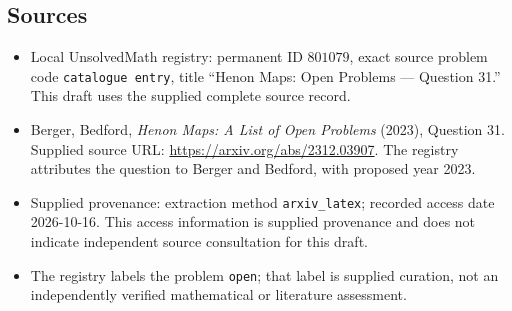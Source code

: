 \documentclass[11pt]{article}
\begin{document}
\subsection{Sources}
\begin{itemize}
\item Local UnsolvedMath registry: permanent ID \(801079\), exact source problem code \texttt{catalogue entry}, title ``Henon Maps: Open Problems --- Question 31.'' This draft uses the supplied complete source record.
\item Berger, Bedford, \emph{Henon Maps: A List of Open Problems} (2023), Question 31. Supplied source URL: \url{https://arxiv.org/abs/2312.03907}. The registry attributes the question to Berger and Bedford, with proposed year 2023.
\item Supplied provenance: extraction method \texttt{arxiv\_latex}; recorded access date 2026-10-16. This access information is supplied provenance and does not indicate independent source consultation for this draft.
\item The registry labels the problem \texttt{open}; that label is supplied curation, not an independently verified mathematical or literature assessment.
\end{itemize}
\end{document}

